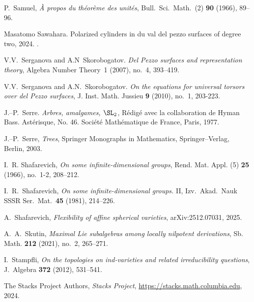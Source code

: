P.~Samuel, \emph{\`A propos du th\'eor\`eme des unit\'es},
Bull.\ Sci.\ Math.\ (2) \textbf{90} (1966), 89--96.

Masatomo Sawahara.
\newblock Polarized cylinders in du val del pezzo surfaces of degree two, 2024.
\newblock \href {https://arxiv.org/abs/2412.09848} {}.

V.V.~Serganova and A.N~Skorobogatov.
\emph{Del Pezzo surfaces and representation theory}, Algebra Number Theory~1 (2007), no.~4, 393--419.

V.V.~Serganova and A.N.~Skorobogatov.
\emph{On the equations for universal torsors over del Pezzo surfaces}, J. Inst. Math. Jussieu \textbf{9} (2010), no.~1, 203-223.

J.--P.~Serre.  \emph{Arbres, amalgames, $\SL_2$}, R\'edig\'e avec la collaboration de Hyman Bass. Ast\'erisque, No. 46. Soci\'et\'e Math\'ematique de France, Paris, 1977.

J.--P.~Serre,  \emph{Trees}, Springer Monographs in Mathematics, Springer--Verlag, Berlin, 2003.

I.~R. Shafarevich, \emph{On some infinite-dimensional groups}, Rend. Mat.
Appl. (5) \textbf{25} (1966), no.~1-2, 208--212.

I.~R.~Shafarevich, {\em On some infinite-dimensional groups.} II, Izv.\ Akad.\
Nauk SSSR Ser.\ Mat.\ \textbf{45} (1981), 214--226.

A.~Shafarevich, \emph{Flexibility of affine spherical varieties}, arXiv:2512.07031, 2025.


A.~A.~Skutin, \emph{Maximal Lie subalgebras among locally nilpotent derivations}, Sb. Math. \textbf{212} (2021), no.~2, 265--271.

I.~Stampfli, \emph{On the topologies on ind-varieties and related irreducibility questions},  J.\ Algebra \textbf{372} (2012), 531--541.

The {Stacks Project Authors},
\emph{Stacks Project},
\url{https://stacks.math.columbia.edu}, 2024.


